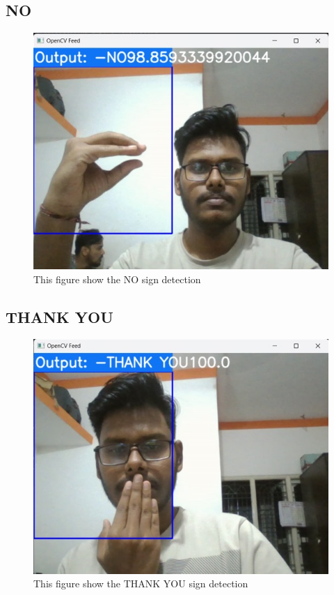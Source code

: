 \subsection{NO}
\begin{figure}[ht]
    \centering
    \includegraphics[width=1.0\linewidth]{images/no.jpg}
    \caption{This figure show the NO sign detection}
    \label{fig:flowchart-sign-language}
\end{figure} 
\newpage
\subsection{THANK YOU}
\begin{figure}[ht]
    \centering
    \includegraphics[width=1.0\linewidth]{images/thank you.jpg}
    \caption{This figure show the THANK YOU sign detection}
    \label{fig:flowchart-sign-language}
\end{figure} 

